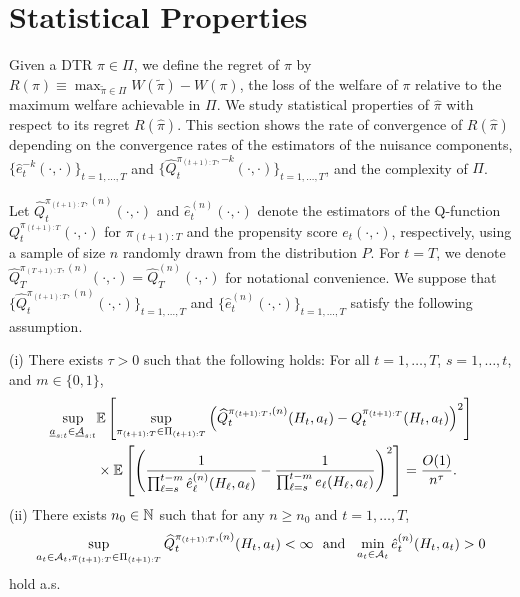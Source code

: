





\section{Statistical Properties}\label{sec:statistical_properties}

Given a DTR $\pi \in \Pi$, we define the regret of $\pi$ by $R(\pi) \equiv \max_{\tilde{\pi} \in \Pi}W(\tilde{\pi}) - W(\pi)$, the loss of the welfare of $\pi$ relative to the maximum welfare achievable in $\Pi$.
We study statistical properties of $\hat{\pi}$ with respect to its regret $R(\hat{\pi})$. This section shows the rate of convergence of $R(\hat{\pi})$ depending on the convergence rates of the estimators of the nuisance components, $\{\hat{e}_{t}^{-k}(\cdot,\cdot)\}_{t=1,\ldots,T}$ and  $\{\widehat{Q}_{t}^{\pi_{(t+1):T},-k}(\cdot,\cdot)\}_{t=1,\ldots,T}$, and the complexity of $\Pi$. 

Let $\widehat{Q}_{t}^{\pi_{(t+1):T},(n)}(\cdot,\cdot)$ and $\hat{e}_{t}^{(n)}(\cdot,\cdot)$ denote the estimators of the Q-function $Q_{t}^{\pi_{(t+1):T}}(\cdot,\cdot)$ for $\pi_{(t+1):T}$ and the propensity score $e_t(\cdot,\cdot)$, respectively, using a sample of size $n$ randomly drawn from the distribution $P$. For $t=T$, we denote $\widehat{Q}_{T}^{\pi_{(T+1):T},(n)}(\cdot,\cdot) = \widehat{Q}_{T}^{(n)}(\cdot,\cdot)$ for notational convenience.
We suppose that $\{\widehat{Q}_{t}^{\pi_{(t+1):T},(n)}(\cdot,\cdot)\}_{t=1,\ldots,T}$ and $\{\hat{e}_{t}^{(n)}(\cdot,\cdot)\}_{t=1,\ldots,T}$ satisfy the following assumption.

\medskip{}

\begin{assumption}\label{asm:rate_of_convergence_backward}
(i) There exists $\tau >0$ such that the following holds: For all $t=1,\ldots,T$, $s=1,\ldots,t$, and $m \in \{0,1\}$,
\begin{align*}
    \sup_{\underline{a}_{s:t} \in \underline{\mathcal{A}}_{s:t}} & \mathbb{E}\left[ \sup_{\pi_{(t+1):T} \in \Pi_{(t+1):T}}\left(\widehat{Q}_{t}^{\pi_{(t+1):T},(n)}(H_{t},a_{t}) - Q_{t}^{\pi_{(t+1):T}}(H_{t},a_{t})\right)^{2}\right] \\
    &\times \mathbb{E}\left[\left(\frac{1}{\prod_{\ell=s}^{t-m}\hat{e}_{\ell}^{(n)}(H_{\ell},a_{\ell})} - \frac{1}{\prod_{\ell=s}^{t-m}e_{\ell}(H_{\ell},a_{\ell})} \right)^{2}\right] = \frac{O(1)}{n^{\tau}}.
\end{align*}
(ii) There exists $n_0 \in \mathbb{N}$ such that for any $n \geq n_0$ and $t=1,\ldots,T$, 
\begin{align*}
     \sup_{a_{t} \in \MA_{t}, \pi_{(t+1):T} \in \Pi_{(t+1):T}}\widehat{Q}_{t}^{\pi_{(t+1):T},(n)}(H_{t},a_{t}) < \infty \mbox{\ \ and\ \ }
     \min_{a_t \in \MA_t}\hat{e}_{t}^{(n)}(H_{t},a_{t}) > 0 %
\end{align*}
hold a.s.
\end{assumption}

